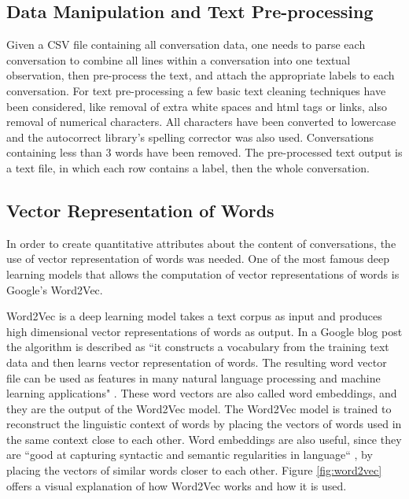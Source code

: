 \documentclass[11pt]{article}
\begin{document}
\subsection{Data Manipulation and Text Pre-processing}
Given a CSV file containing all conversation data, one needs to parse each conversation to combine all lines within a conversation into one textual observation, then pre-process the text, and attach the appropriate labels to each conversation. For text pre-processing a few basic text cleaning techniques have been considered, like removal of extra white spaces and html tags or links, also removal of numerical characters. All characters have been converted to lowercase and the autocorrect \cite{mccallum_2016} library's spelling corrector was also used. Conversations containing less than 3 words have been removed. The pre-processed text output is a text file, in which each row contains a label, then the whole conversation.


\subsection{Vector Representation of Words}
In order to create quantitative attributes about the content of conversations, the use of vector representation of words was needed. One of the most famous deep learning models that allows the computation of vector representations of words is Google's Word2Vec.

Word2Vec is a deep learning model takes a text corpus as input and produces high dimensional vector representations of words as output. In a Google blog post the algorithm is described as ``it constructs a vocabulary from the training text data and then learns vector representation of words. The resulting word vector file can be used as features in many natural language processing and machine learning applications" \cite{mikolov_2013}. 
These word vectors are also called word embeddings, and they are the output of the Word2Vec model. The Word2Vec model is trained to reconstruct the linguistic context of words by placing the vectors of words used in the same context close to each other. Word embeddings are also useful, since they are ``good at capturing syntactic and semantic regularities in language`` \cite{mikolov2013linguistic}, by placing the vectors of similar words closer to each other. Figure \ref{fig:word2vec} offers a visual explanation of how Word2Vec works and how it is used.
\end{document}
